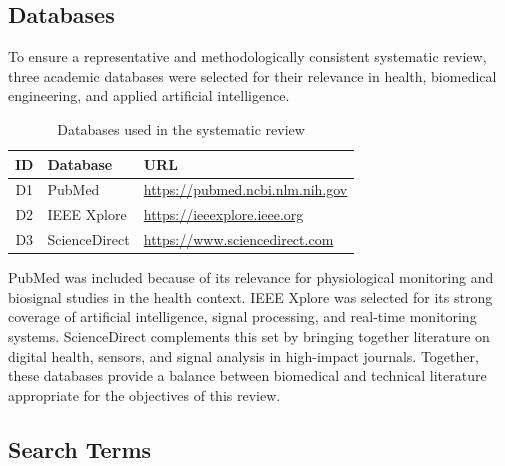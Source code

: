 \documentclass[runningheads]{llncs}
\begin{document}
\subsection{Databases}

To ensure a representative and methodologically consistent systematic review, three academic databases were selected for their relevance in health, biomedical engineering, and applied artificial intelligence.

\begin{table}[H]
\caption{Databases used in the systematic review}
\label{tab:bases}
\centering
\begin{tabular}{c l l}
\hline
\textbf{ID} & \textbf{Database} & \textbf{URL} \\
\hline
D1 & PubMed & \url{https://pubmed.ncbi.nlm.nih.gov} \\
D2 & IEEE Xplore & \url{https://ieeexplore.ieee.org} \\
D3 & ScienceDirect & \url{https://www.sciencedirect.com} \\
\hline
\end{tabular}
\end{table}

PubMed was included because of its relevance for physiological monitoring and biosignal studies in the health context. IEEE Xplore was selected for its strong coverage of artificial intelligence, signal processing, and real-time monitoring systems. ScienceDirect complements this set by bringing together literature on digital health, sensors, and signal analysis in high-impact journals. Together, these databases provide a balance between biomedical and technical literature appropriate for the objectives of this review.

\subsection{Search Terms}
\end{document}
